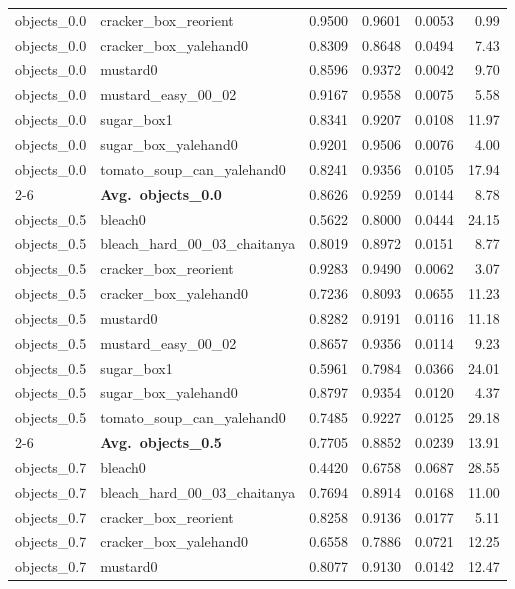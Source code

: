\begin{longtable}{llrrrr}
  objects_0.0 & cracker\_box\_reorient & 0.9500 & 0.9601 & 0.0053 & 0.99 \\
  objects_0.0 & cracker\_box\_yalehand0 & 0.8309 & 0.8648 & 0.0494 & 7.43 \\
  objects_0.0 & mustard0 & 0.8596 & 0.9372 & 0.0042 & 9.70 \\
  objects_0.0 & mustard\_easy\_00\_02 & 0.9167 & 0.9558 & 0.0075 & 5.58 \\
  objects_0.0 & sugar\_box1 & 0.8341 & 0.9207 & 0.0108 & 11.97 \\
  objects_0.0 & sugar\_box\_yalehand0 & 0.9201 & 0.9506 & 0.0076 & 4.00 \\
  objects_0.0 & tomato\_soup\_can\_yalehand0 & 0.8241 & 0.9356 & 0.0105 & 17.94 \\
  \cmidrule{2-6}
  & \textbf{Avg.~objects_0.0} & 0.8626 & 0.9259 & 0.0144 & 8.78 \\
  \midrule
  objects_0.5 & bleach0 & 0.5622 & 0.8000 & 0.0444 & 24.15 \\
  objects_0.5 & bleach\_hard\_00\_03\_chaitanya & 0.8019 & 0.8972 & 0.0151 & 8.77 \\
  objects_0.5 & cracker\_box\_reorient & 0.9283 & 0.9490 & 0.0062 & 3.07 \\
  objects_0.5 & cracker\_box\_yalehand0 & 0.7236 & 0.8093 & 0.0655 & 11.23 \\
  objects_0.5 & mustard0 & 0.8282 & 0.9191 & 0.0116 & 11.18 \\
  objects_0.5 & mustard\_easy\_00\_02 & 0.8657 & 0.9356 & 0.0114 & 9.23 \\
  objects_0.5 & sugar\_box1 & 0.5961 & 0.7984 & 0.0366 & 24.01 \\
  objects_0.5 & sugar\_box\_yalehand0 & 0.8797 & 0.9354 & 0.0120 & 4.37 \\
  objects_0.5 & tomato\_soup\_can\_yalehand0 & 0.7485 & 0.9227 & 0.0125 & 29.18 \\
  \cmidrule{2-6}
  & \textbf{Avg.~objects_0.5} & 0.7705 & 0.8852 & 0.0239 & 13.91 \\
  \midrule
  objects_0.7 & bleach0 & 0.4420 & 0.6758 & 0.0687 & 28.55 \\
  objects_0.7 & bleach\_hard\_00\_03\_chaitanya & 0.7694 & 0.8914 & 0.0168 & 11.00 \\
  objects_0.7 & cracker\_box\_reorient & 0.8258 & 0.9136 & 0.0177 & 5.11 \\
  objects_0.7 & cracker\_box\_yalehand0 & 0.6558 & 0.7886 & 0.0721 & 12.25 \\
  objects_0.7 & mustard0 & 0.8077 & 0.9130 & 0.0142 & 12.47 \\

\end{longtable}

